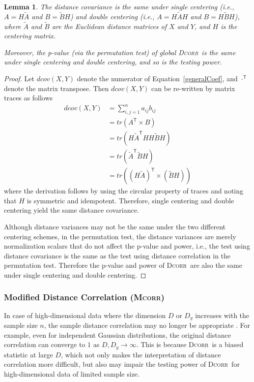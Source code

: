 \documentclass[11pt]{article}
\providecommand{\sct}[1]{{\normalfont\textsc{#1}}}
\newcommand{\T}{^{\ensuremath{\mathsf{T}}}}           %
\newcommand{\Dcorr}{\sct{Dcorr}}
\newcommand{\Mcorr}{\sct{Mcorr}}
\newtheorem{lem}{Lemma}
\begin{document}
\begin{lem}
\label{lem1}
The distance covariance is the same under single centering (i.e., $A=H\tilde{A}$ and $B=\tilde{B}H$) and double centering (i.e., $A=H\tilde{A}H$ and $B=H\tilde{B}H$), where $\tilde{A}$ and $\tilde{B}$ are the Euclidean distance matrices of $X$ and $Y$, and $H$ is the centering matrix. 

Moreover, the p-value (via the permutation test) of global \Dcorr~is the same under single centering and double centering, and so is the testing power.
\end{lem}
\begin{proof}
Let $dcov(X,Y)$ denote the numerator of Equation~\ref{generalCoef}, and $\cdot\T$ denote the matrix transpose. Then $dcov(X,Y)$ can be re-written by matrix traces as follows
\begin{align*}
dcov(X,Y) &= \sum_{i,j=1}^{n}a_{ij}b_{ij} \\
 &= tr(A\T \times B) \\
 &= tr(H\tilde{A}\T HH\tilde{B}H) \\
 &= tr(\tilde{A}\T \tilde{B}H) \\
 &= tr((H\tilde{A})\T \times (\tilde{B}H))
\end{align*}
where the derivation follows by using the circular property of traces and noting that $H$ is symmetric and idempotent. Therefore, single centering and double centering yield the same distance covariance.

Although distance variances may not be the same under the two different centering schemes, in the permutation test, the distance variances are merely normalization scalars that do not affect the p-value and power, i.e., the test using distance covariance is the same as the test using distance correlation in the permutation test. Therefore the p-value and power of \Dcorr~are also the same under single centering and double centering.
\end{proof}

\subsubsection{Modified Distance Correlation (\Mcorr)}
\label{appen:mcorr}
In case of high-dimensional data where the dimension $D$ or $D_y$ increases with the sample size $n$, the sample distance correlation may no longer be appropriate \cite{SzekelyRizzo2013a}. For example, even for independent Gaussian distributions, the original distance correlation can converge to $1$ as $D, D_y \rightarrow \infty$. This is because \Dcorr~is a biased statistic at large $D$, which not only makes the interpretation of distance correlation more difficult, but also may impair the testing power of \Dcorr~for high-dimensional data of limited sample size.
\end{document}
